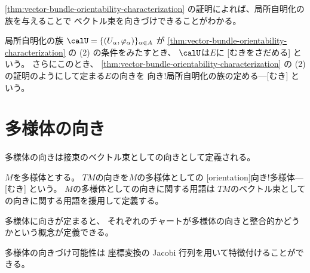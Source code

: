 \documentclass[report]{jlreq}
\begin{document}
\cref{thm:vector-bundle-orientability-characterization}
の証明によれば、局所自明化の族を与えることで
ベクトル束を向きづけできることがわかる。

\begin{definition}[局所自明化の族が定める向き]
    局所自明化の族
    $\calU = \{ (U_\alpha, \varphi_\alpha) \}_{\alpha \in A}$
    が
    \cref{thm:vector-bundle-orientability-characterization}
    の (2) の条件をみたすとき、
    $\calU$は$E$に
    [むきをさだめる]
    という。
    さらにこのとき、
    \cref{thm:vector-bundle-orientability-characterization}
    の (2) の証明のようにして定まる$E$の向きを
        {向き!局所自明化の族の定める---}[むき]
    という。

\end{definition}


%
\section{多様体の向き}

多様体の向きは接束のベクトル束としての向きとして定義される。

\begin{definition}[多様体の向き]
    $M$を多様体とする。
    $TM$の向きを$M$の多様体としての
    [orientation]{向き!多様体---}[むき]
    という。
    $M$の多様体としての向きに関する用語は
    $TM$のベクトル束としての向きに関する用語を援用して定義する。
\end{definition}

多様体に向きが定まると、
それぞれのチャートが多様体の向きと整合的かどうかという概念が定義できる。


多様体の向きづけ可能性は
座標変換の Jacobi 行列を用いて特徴付けることができる。
\end{document}

